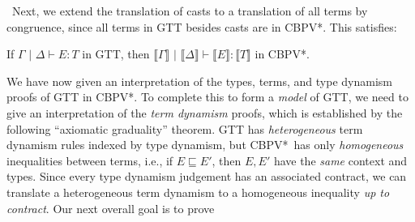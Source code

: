 \documentclass[acmsmall,screen,12pt]{acmart}
\newif\iflong
\newcommand{\cbpvstar}{CBPV*}
\newcommand{\sem}[1]{\llbracket#1\rrbracket}
\newcommand{\pipe}{\,\,|\,\,}
\newcommand{\ltdyn}{\sqsubseteq}
\begin{document}
\ Next, we extend the translation of casts to a translation of all terms
by congruence, since all terms in GTT besides casts are
in \cbpvstar.  This satisfies:
\begin{lemma}
  If $\Gamma\pipe\Delta \vdash E : T$ in GTT, then $\sem{\Gamma}
  \pipe\sem\Delta\vdash \sem E : \sem T$ in \cbpvstar.
\end{lemma}

\iflong
\subsubsection{Interpretation of Term Dynamism}
\fi
We have now given an interpretation of the types, terms, and
type dynamism proofs of GTT in \cbpvstar.
%
To complete this to form a \emph{model} of GTT, we need to give an
interpretation of the \emph{term dynamism} proofs, which is 
established by the
following ``axiomatic graduality'' theorem.  
%
GTT has \emph{heterogeneous} term dynamism
rules indexed by type dynamism, but \cbpvstar\  has only \emph{homogeneous}
inequalities between terms, i.e., if $E \ltdyn E'$, then $E,E'$ have
the \emph{same} context and types.
%
Since every type dynamism judgement has an associated contract, we can
translate a heterogeneous term dynamism to a homogeneous inequality
\emph{up to contract}.  Our next overall goal is to prove
\end{document}
